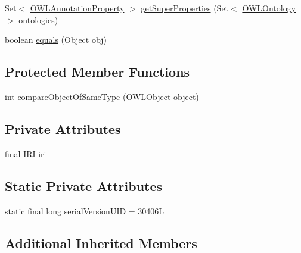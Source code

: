 \begin{DoxyCompactItemize}
\item 
Set$<$ \hyperlink{interfaceorg_1_1semanticweb_1_1owlapi_1_1model_1_1_o_w_l_annotation_property}{O\-W\-L\-Annotation\-Property} $>$ \hyperlink{classuk_1_1ac_1_1manchester_1_1cs_1_1owl_1_1owlapi_1_1_o_w_l_annotation_property_impl_abe8c59a2c88539199dc8d0f3ff5b1081}{get\-Super\-Properties} (Set$<$ \hyperlink{interfaceorg_1_1semanticweb_1_1owlapi_1_1model_1_1_o_w_l_ontology}{O\-W\-L\-Ontology} $>$ ontologies)
\item 
boolean \hyperlink{classuk_1_1ac_1_1manchester_1_1cs_1_1owl_1_1owlapi_1_1_o_w_l_annotation_property_impl_a0bf3035457b9fa2ec653d65bd3d583d7}{equals} (Object obj)
\end{DoxyCompactItemize}
\subsection*{Protected Member Functions}
\begin{DoxyCompactItemize}
\item 
int \hyperlink{classuk_1_1ac_1_1manchester_1_1cs_1_1owl_1_1owlapi_1_1_o_w_l_annotation_property_impl_a370943d5ef42bdf82c41eb1ecea7443f}{compare\-Object\-Of\-Same\-Type} (\hyperlink{interfaceorg_1_1semanticweb_1_1owlapi_1_1model_1_1_o_w_l_object}{O\-W\-L\-Object} object)
\end{DoxyCompactItemize}
\subsection*{Private Attributes}
\begin{DoxyCompactItemize}
\item 
final \hyperlink{classorg_1_1semanticweb_1_1owlapi_1_1model_1_1_i_r_i}{I\-R\-I} \hyperlink{classuk_1_1ac_1_1manchester_1_1cs_1_1owl_1_1owlapi_1_1_o_w_l_annotation_property_impl_a9fbc4239078f8a5871b59af92c235b0a}{iri}
\end{DoxyCompactItemize}
\subsection*{Static Private Attributes}
\begin{DoxyCompactItemize}
\item 
static final long \hyperlink{classuk_1_1ac_1_1manchester_1_1cs_1_1owl_1_1owlapi_1_1_o_w_l_annotation_property_impl_ab22604a5a24eb1c1dca1722d04ea4f7d}{serial\-Version\-U\-I\-D} = 30406\-L
\end{DoxyCompactItemize}
\subsection*{Additional Inherited Members}


